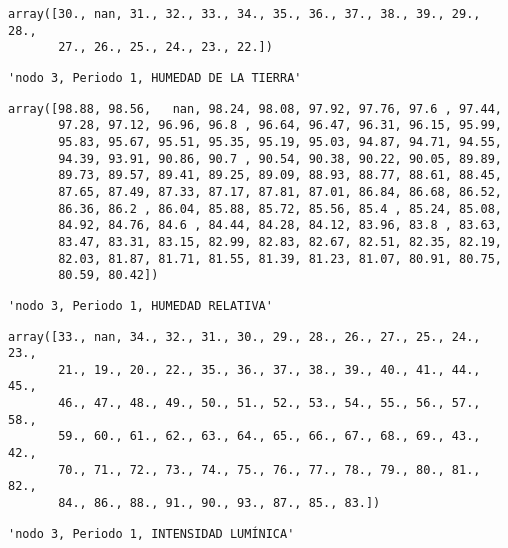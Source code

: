 \documentclass[11pt]{article}
\begin{document}
    \begin{verbatim}
array([30., nan, 31., 32., 33., 34., 35., 36., 37., 38., 39., 29., 28.,
       27., 26., 25., 24., 23., 22.])
    \end{verbatim}

    
    
    \begin{verbatim}
'nodo 3, Periodo 1, HUMEDAD DE LA TIERRA'
    \end{verbatim}

    
    
    \begin{verbatim}
array([98.88, 98.56,   nan, 98.24, 98.08, 97.92, 97.76, 97.6 , 97.44,
       97.28, 97.12, 96.96, 96.8 , 96.64, 96.47, 96.31, 96.15, 95.99,
       95.83, 95.67, 95.51, 95.35, 95.19, 95.03, 94.87, 94.71, 94.55,
       94.39, 93.91, 90.86, 90.7 , 90.54, 90.38, 90.22, 90.05, 89.89,
       89.73, 89.57, 89.41, 89.25, 89.09, 88.93, 88.77, 88.61, 88.45,
       87.65, 87.49, 87.33, 87.17, 87.81, 87.01, 86.84, 86.68, 86.52,
       86.36, 86.2 , 86.04, 85.88, 85.72, 85.56, 85.4 , 85.24, 85.08,
       84.92, 84.76, 84.6 , 84.44, 84.28, 84.12, 83.96, 83.8 , 83.63,
       83.47, 83.31, 83.15, 82.99, 82.83, 82.67, 82.51, 82.35, 82.19,
       82.03, 81.87, 81.71, 81.55, 81.39, 81.23, 81.07, 80.91, 80.75,
       80.59, 80.42])
    \end{verbatim}

    
    
    \begin{verbatim}
'nodo 3, Periodo 1, HUMEDAD RELATIVA'
    \end{verbatim}

    
    
    \begin{verbatim}
array([33., nan, 34., 32., 31., 30., 29., 28., 26., 27., 25., 24., 23.,
       21., 19., 20., 22., 35., 36., 37., 38., 39., 40., 41., 44., 45.,
       46., 47., 48., 49., 50., 51., 52., 53., 54., 55., 56., 57., 58.,
       59., 60., 61., 62., 63., 64., 65., 66., 67., 68., 69., 43., 42.,
       70., 71., 72., 73., 74., 75., 76., 77., 78., 79., 80., 81., 82.,
       84., 86., 88., 91., 90., 93., 87., 85., 83.])
    \end{verbatim}

    
    
    \begin{verbatim}
'nodo 3, Periodo 1, INTENSIDAD LUMÍNICA'
    \end{verbatim}

    
    
\end{document}
